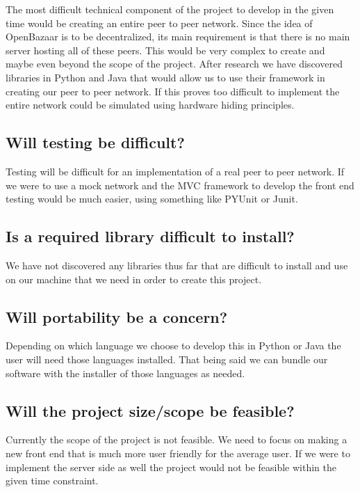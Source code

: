 \documentclass{article}
\begin{document}
The most difficult technical component of the project to develop in the given time would be creating an entire peer to peer network.
 Since the idea of OpenBazaar is to be decentralized, its main requirement is that there is no main server hosting all of these peers. This would be very complex to create and maybe even beyond the scope of the project. After research we have discovered libraries in Python and Java that would allow us to use their framework in creating our peer to peer network. If this proves too difficult to implement the entire network could be simulated using hardware hiding principles.

\subsection{Will testing be difficult?}

Testing will be difficult for an implementation of a real peer to peer network. If we were to use a mock network and the MVC framework to develop the front end testing would be much easier, using something like PYUnit or Junit.

\subsection{Is a required library difficult to install?}

We have not discovered any libraries thus far that are difficult to install and use on our machine that we need in order to create this project.

\subsection{Will portability be a concern?}

Depending on which language we choose to develop this in Python or Java the user will need those languages installed. That being said we can bundle our software with the installer of those languages as needed.

\subsection{Will the project size/scope be feasible?}

Currently the scope of the project is not feasible. We need to focus on making a new front end that is much more user friendly for the average user. If we were to implement the server side as well the project would not be feasible within the given time constraint.
\end{document}

